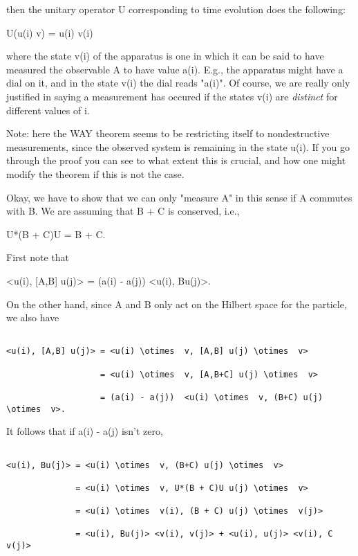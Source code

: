 then the unitary operator U corresponding to time evolution does the
following:

U(u(i) \otimes  v) = u(i) \otimes  v(i)

where the state v(i) of the apparatus is one in which it can be
said to have measured the observable A to have value a(i).  E.g., the
apparatus might have a dial on it, and in the state v(i) the dial reads
"a(i)".   Of course, we are really only justified in saying a
measurement has occured if the states v(i) are \emph{distinct} for different
values of i.  

Note: here the WAY theorem seems to be restricting itself to
nondestructive measurements, since the observed system is remaining in
the state u(i).  If you go through the proof you can see to what extent
this is crucial, and how one might modify the theorem if this is not the
case.

Okay, we have to show that we can only "measure A" in this sense if 
A commutes with B.  We are assuming that B + C is conserved, i.e.,

U*(B + C)U = B + C.  

First note that

<u(i), [A,B] u(j)> = (a(i) - a(j)) <u(i), Bu(j)>.

On the other hand, since A and B only act on the Hilbert space for the
particle, we also have 


\begin{verbatim}

<u(i), [A,B] u(j)> = <u(i) \otimes  v, [A,B] u(j) \otimes  v> 

                   = <u(i) \otimes  v, [A,B+C] u(j) \otimes  v>

                   = (a(i) - a(j))  <u(i) \otimes  v, (B+C) u(j) \otimes  v>.
\end{verbatim}
    

It follows that if a(i) - a(j) isn't zero,


\begin{verbatim}

<u(i), Bu(j)> = <u(i) \otimes  v, (B+C) u(j) \otimes  v>

              = <u(i) \otimes  v, U*(B + C)U u(j) \otimes  v>

              = <u(i) \otimes  v(i), (B + C) u(j) \otimes  v(j)> 

              = <u(i), Bu(j)> <v(i), v(j)> + <u(i), u(j)> <v(i), C v(j)>
\end{verbatim}
    


